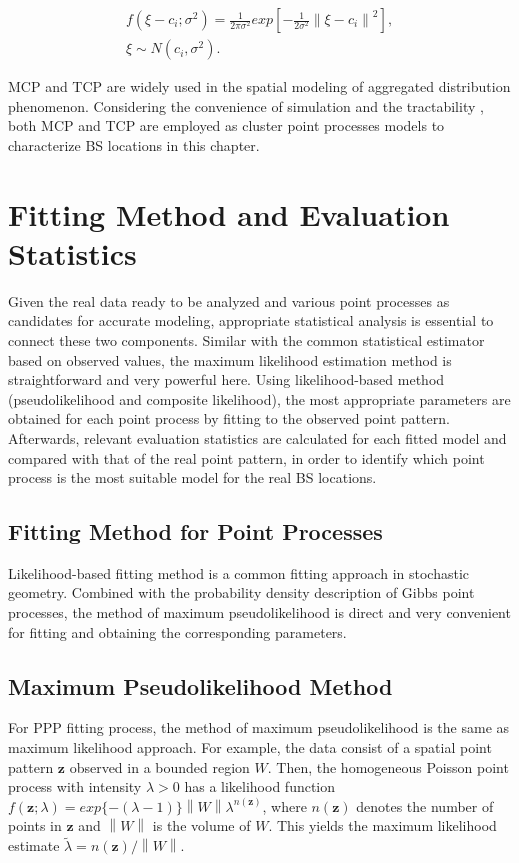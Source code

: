 \begin{equation} \label{thomas}
\begin{aligned}
f(\xi-c_i;\sigma^2)=\frac{1}{2\pi\sigma^2}exp[-\frac{1}{2\sigma^2}{\parallel\xi-c_i\parallel}^2], \\ \xi\sim N(c_i,\sigma^2).
\end{aligned}
\end{equation}

MCP and TCP are widely used in the spatial modeling of aggregated distribution phenomenon. Considering the convenience of simulation \cite{moller2003statistical} and the tractability \cite{ganti2009interference}, both MCP and TCP are employed as cluster point processes models to characterize BS locations in this chapter.

\section{Fitting Method and Evaluation Statistics} \label{sec3-4}
Given the real data ready to be analyzed and various point processes as candidates for accurate modeling, appropriate statistical analysis is essential to connect these two components. Similar with the common statistical estimator based on observed values, the maximum likelihood estimation method is straightforward and very powerful here. Using likelihood-based method (pseudolikelihood and composite likelihood), the most appropriate parameters are obtained for each point process by fitting to the observed point pattern. Afterwards, relevant evaluation statistics are calculated for each fitted model and compared with that of the real point pattern, in order to identify which point process is the most suitable model for the real BS locations.
\subsection{Fitting Method for Point Processes}
Likelihood-based fitting method is a common fitting approach in stochastic geometry. Combined with the probability density description of Gibbs point processes, the method of maximum pseudolikelihood is direct and very convenient for fitting and obtaining the corresponding parameters.

\subsection*{Maximum Pseudolikelihood Method}
For PPP fitting process, the method of maximum pseudolikelihood is the same as maximum likelihood approach. For example, the data consist of a spatial point pattern $\mathbf{z}$ observed in a bounded region $W$. Then, the homogeneous Poisson point process with intensity $\lambda>0$ has a likelihood function $f(\mathbf{z};\lambda)=exp\{-(\lambda-1)\}{\left\| W \right\|}\lambda^{n(\mathbf{z})}$, where $n(\mathbf{z})$ denotes the number of points in $\mathbf{z}$ and $\left\| W \right\|$ is the volume of $W$. This yields the maximum likelihood estimate $\tilde{\lambda}=n(\mathbf{z})/\left\| W \right\|$.

